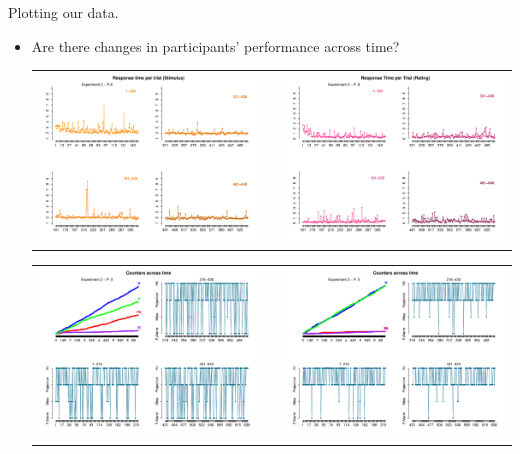 \documentclass[final]{beamer}
\newlength{\onecolwid}
\newlength{\twocolwid}
\begin{document}
\begin{frame}[t]
\begin{columns}[t]
\begin{column}{\twocolwid}
\begin{columns}[t,totalwidth=\twocolwid]
\begin{column}{\onecolwid}
\begin{alertblock}{Plotting our data.}
\begin{itemize}
\item Are there changes in participants' performance across time?

\begin{center}
\begin{tabular}{ccc}
\includegraphics[width=0.48\linewidth]{Figures/4_RT_St.pdf} & \hfill & \includegraphics[width=0.48\linewidth]{Figures/4_RT_CR.pdf}
\end{tabular}
\end{center}


\begin{center}
\begin{tabular}{ccc}
\includegraphics[width=0.48\linewidth]{Figures/2_Counters.pdf} & \hfill & \includegraphics[width=0.48\linewidth]{Figures/2_Counters_.pdf}
\end{tabular}
\end{center}



\end{itemize}
\end{alertblock}
\end{column}
\end{columns}
\end{column}
\end{columns}
\end{frame}
\end{document}
